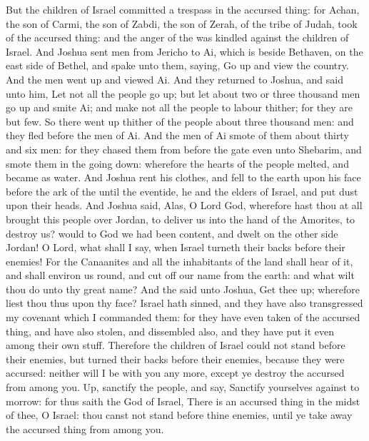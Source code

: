 \begin{biblechapter} %
 But the children of Israel committed a trespass in the accursed thing: for Achan, the son of Carmi, the son of Zabdi, the son of Zerah, of the tribe of Judah, took of the accursed thing: and the anger of the \LORD was kindled against the children of Israel.
\verse And Joshua sent men from Jericho to Ai, which is beside Bethaven, on the east side of Bethel, and spake unto them, saying, Go up and view the country. And the men went up and viewed Ai.
\verse And they returned to Joshua, and said unto him, Let not all the people go up; but let about two or three thousand men go up and smite Ai; and make not all the people to labour thither; for they are but few.
\verse So there went up thither of the people about three thousand men: and they fled before the men of Ai.
\verse And the men of Ai smote of them about thirty and six men: for they chased them from before the gate even unto Shebarim, and smote them in the going down: wherefore the hearts of the people melted, and became as water.
\verse And Joshua rent his clothes, and fell to the earth upon his face before the ark of the \LORD until the eventide, he and the elders of Israel, and put dust upon their heads.
\verse And Joshua said, Alas, O Lord God, wherefore hast thou at all brought this people over Jordan, to deliver us into the hand of the Amorites, to destroy us? would to God we had been content, and dwelt on the other side Jordan!
\verse O Lord, what shall I say, when Israel turneth their backs before their enemies!
\verse For the Canaanites and all the inhabitants of the land shall hear of it, and shall environ us round, and cut off our name from the earth: and what wilt thou do unto thy great name?
\verse And the \LORD said unto Joshua, Get thee up; wherefore liest thou thus upon thy face?
\verse Israel hath sinned, and they have also transgressed my covenant which I commanded them: for they have even taken of the accursed thing, and have also stolen, and dissembled also, and they have put it even among their own stuff.
\verse Therefore the children of Israel could not stand before their enemies, but turned their backs before their enemies, because they were accursed: neither will I be with you any more, except ye destroy the accursed from among you.
\verse Up, sanctify the people, and say, Sanctify yourselves against to morrow: for thus saith the \LORD God of Israel, There is an accursed thing in the midst of thee, O Israel: thou canst not stand before thine enemies, until ye take away the accursed thing from among you.

\end{biblechapter}
